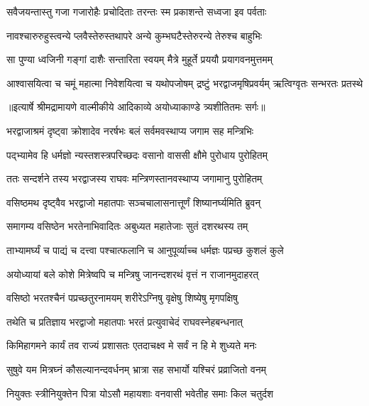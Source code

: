 \twolineshloka
{सवैजयन्तास्तु गजा गजारोहैः प्रचोदिताः}
{तरन्तः स्म प्रकाशन्ते सध्वजा इव पर्वताः} %

\twolineshloka
{नावश्चारुरुहुस्त्वन्ये प्लवैस्तेरुस्तथापरे}
{अन्ये कुम्भघटैस्तेरुरन्ये तेरुश्च बाहुभिः} %

\twolineshloka
{सा पुण्या ध्वजिनी गङ्गां दाशैः सन्तारिता स्वयम्}
{मैत्रे मुहूर्ते प्रययौ प्रयागवनमुत्तमम्} %

\fourlineindentedshloka
{आश्वासयित्वा च चमूं महात्मा}
{निवेशयित्वा च यथोपजोषम्}
{द्रष्टुं भरद्वाजमृषिप्रवर्यम्}
{ऋत्विग्वृतः सन्भरतः प्रतस्थे} %


{॥इत्यार्षे श्रीमद्रामायणे वाल्मीकीये आदिकाव्ये अयोध्याकाण्डे त्र्यशीतितमः सर्गः॥}


\twolineshloka
{भरद्वाजाश्रमं दृष्ट्वा क्रोशादेव नरर्षभः}
{बलं सर्वमवस्थाप्य जगाम सह मन्त्रिभिः} %

\twolineshloka
{पद्भ्यामेव हि धर्मज्ञो न्यस्तशस्त्रपरिच्छदः}
{वसानो वाससी क्षौमे पुरोधाय पुरोहितम्} %

\twolineshloka
{ततः सन्दर्शने तस्य भरद्वाजस्य राघवः}
{मन्त्रिणस्तानवस्थाप्य जगामानु पुरोहितम्} %

\twolineshloka
{वसिष्ठमथ दृष्ट्वैव भरद्वाजो महातपाः}
{सञ्चचालासनात्तूर्णं शिष्यानर्घ्यमिति ब्रुवन्} %

\twolineshloka
{समागम्य वसिष्ठेन भरतेनाभिवादितः}
{अबुध्यत महातेजाः सुतं दशरथस्य तम्} %

\twolineshloka
{ताभ्यामर्घ्यं च पाद्यं च दत्त्वा पश्चात्फलानि च}
{आनुपूर्व्याच्च धर्मज्ञः पप्रच्छ कुशलं कुले} %

\twolineshloka
{अयोध्यायां बले कोशे मित्रेष्वपि च मन्त्रिषु}
{जानन्दशरथं वृत्तं न राजानमुदाहरत्} %

\twolineshloka
{वसिष्ठो भरतश्चैनं पप्रच्छतुरनामयम्}
{शरीरेऽग्निषु वृक्षेषु शिष्येषु मृगपक्षिषु} %

\twolineshloka
{तथेति च प्रतिज्ञाय भरद्वाजो महातपाः}
{भरतं प्रत्युवाचेदं राघवस्नेहबन्धनात्} %

\twolineshloka
{किमिहागमने कार्यं तव राज्यं प्रशासतः}
{एतदाचक्ष्व मे सर्वं न हि मे शुध्यते मनः} %

\twolineshloka
{सुषुवे यम मित्रघ्नं कौसल्यानन्दवर्धनम्}
{भ्रात्रा सह सभार्यो यश्चिरं प्रव्राजितो वनम्} %

\twolineshloka
{नियुक्तः स्त्रीनियुक्तेन पित्रा योऽसौ महायशाः}
{वनवासी भवेतीह समाः किल चतुर्दश} %

